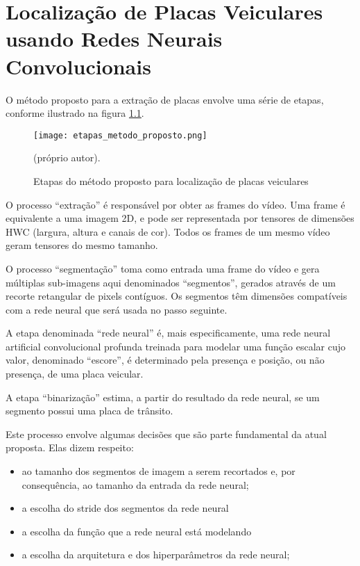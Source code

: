 
\chapter{Localização de Placas Veiculares usando Redes Neurais Convolucionais}

O método proposto para a extração de placas envolve uma série de etapas,
conforme ilustrado na figura \ref{fig:etapas_metodo_proposto}.

\begin{figure}[!htb]
	\centering
	\texttt{[image: etapas\_metodo\_proposto.png]}
	\caption{Etapas do método proposto para localização de placas veiculares}
	\label{fig:etapas_metodo_proposto}
	(próprio autor).
\end{figure}

O processo “extração” é responsável por obter as frames do vídeo. Uma frame é
equivalente a uma imagem 2D, e pode ser representada por tensores de dimensões
HWC (largura, altura e canais de cor). Todos os frames de um mesmo vídeo geram
tensores do mesmo tamanho.

O processo “segmentação” toma como entrada uma frame do vídeo e gera múltiplas
sub-imagens aqui denominados “segmentos”, gerados através de um recorte
retangular de pixels contíguos. Os segmentos têm dimensões compatíveis com a
rede neural que será usada no passo seguinte.

A etapa denominada “rede neural” é, mais especificamente, uma rede neural
artificial convolucional profunda treinada para modelar uma função escalar cujo
valor, denominado “escore”, é determinado pela presença e posição, ou não
presença, de uma placa veicular.

A etapa “binarização” estima, a partir do resultado da rede neural, se um
segmento possui uma placa de trânsito.

Este processo envolve algumas decisões que são parte fundamental da atual
proposta. Elas dizem respeito:

\begin{itemize}
\item ao tamanho dos segmentos de imagem a serem recortados e, por
	consequência, ao tamanho da entrada da rede neural;
\item a escolha do stride dos segmentos da rede neural
\item a escolha da função que a rede neural está modelando
\item a escolha da arquitetura e dos hiperparâmetros da rede neural;
\end{itemize}

